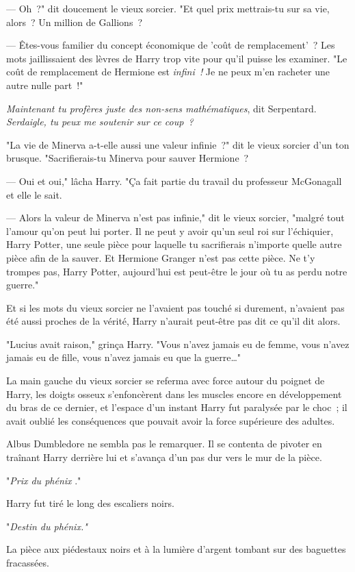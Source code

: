 --- Oh~?" dit doucement le vieux sorcier. "Et quel prix mettrais-tu sur sa vie, alors~? Un million de Gallions~?

--- Êtes-vous familier du concept économique de 'coût de remplacement'~? Les mots jaillissaient des lèvres de Harry trop vite pour qu'il puisse les examiner. "Le coût de remplacement de Hermione est \emph{infini~!} Je ne peux m'en racheter une autre nulle part~!"

\emph{Maintenant tu profères juste des non-sens mathématiques}, dit Serpentard. \emph{Serdaigle, tu peux me soutenir sur ce coup~?}

"La vie de Minerva a-t-elle aussi une valeur infinie~?" dit le vieux sorcier d'un ton brusque. "Sacrifierais-tu Minerva pour sauver Hermione~?

--- Oui et oui," lâcha Harry. "Ça fait partie du travail du professeur McGonagall et elle le sait.

--- Alors la valeur de Minerva n'est pas infinie," dit le vieux sorcier, "malgré tout l'amour qu'on peut lui porter. Il ne peut y avoir qu'un seul roi sur l'échiquier, Harry Potter, une seule pièce pour laquelle tu sacrifierais n'importe quelle autre pièce afin de la sauver. Et Hermione Granger n'est pas cette pièce. Ne t'y trompes pas, Harry Potter, aujourd'hui est peut-être le jour où tu as perdu notre guerre."

Et si les mots du vieux sorcier ne l'avaient pas touché si durement, n'avaient pas été aussi proches de la vérité, Harry n'aurait peut-être pas dit ce qu'il dit alors.

"Lucius avait raison," grinça Harry. "Vous n'avez jamais eu de femme, vous n'avez jamais eu de fille, vous n'avez jamais eu que la guerre…"

La main gauche du vieux sorcier se referma avec force autour du poignet de Harry, les doigts osseux s'enfoncèrent dans les muscles encore en développement du bras de ce dernier, et l'espace d'un instant Harry fut paralysée par le choc~; il avait oublié les conséquences que pouvait avoir la force supérieure des adultes.

Albus Dumbledore ne sembla pas le remarquer. Il se contenta de pivoter en traînant Harry derrière lui et s'avança d'un pas dur vers le mur de la pièce.

"\emph{Prix du phénix} ."

Harry fut tiré le long des escaliers noirs.

"\emph{Destin du phénix."}

La pièce aux piédestaux noirs et à la lumière d'argent tombant sur des baguettes fracassées.

